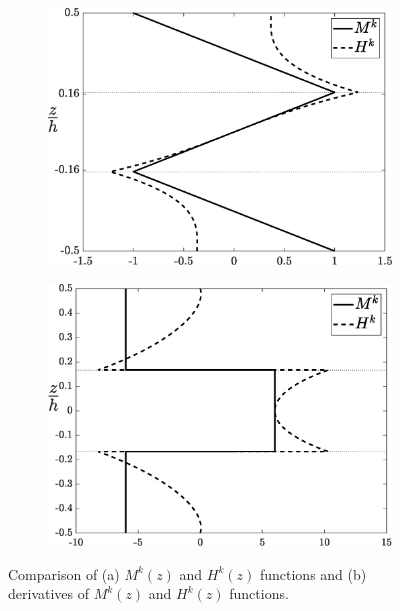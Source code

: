 \documentclass{article}
\begin{document}
\begin{figure}[H]
        \begin{subfigure}{0.5\textwidth}
            \includegraphics[width=1\linewidth, height=0.8\linewidth]{figures/MzHz.eps} 
            \caption{}
            \label{fig:HM}
        \end{subfigure}
        \begin{subfigure}{0.5\textwidth}
            \includegraphics[width=1\linewidth, height=0.8\linewidth]{figures/dMzdHz.eps} 
            \caption{}
            \label{fig:dMH}
        \end{subfigure}
    \caption{Comparison of (a) $M^k(z)$ and $H^k(z)$ functions and (b) derivatives of $M^k(z)$ and $H^k(z)$ functions.}
\end{figure}
\end{document}

